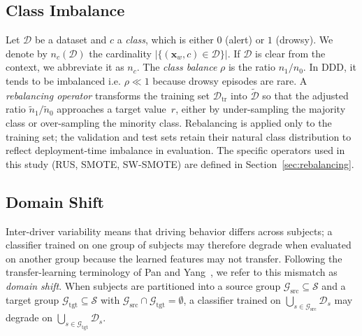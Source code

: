 \documentclass[lettersize,journal]{IEEEtran}
\begin{document}
\subsection{Class Imbalance}\label{sec:class_imbalance}
Let $\mathcal{D}$ be a dataset and $c$ a \emph{class}, which is either $0$ (alert) or $1$ (drowsy). We denote by $n_c(\mathcal{D})$ the cardinality $|\{(\mathbf{x}_w, c) \in \mathcal{D}\}|$.
If $\mathcal{D}$ is clear from the context, we abbreviate it as $n_c$.
The \emph{class balance} $\rho$ is the ratio $n_1/n_0$.
In DDD, it tends to be imbalanced i.e. $\rho \ll 1$ because drowsy episodes are rare.
A \emph{rebalancing operator} transforms the training set $\mathcal{D}_{\mathrm{tr}}$ into $\tilde{\mathcal{D}}$ so that the adjusted ratio $\tilde{n}_1 / \tilde{n}_0$ approaches a target value~$r$, either by under-sampling the majority class or over-sampling the minority class.
Rebalancing is applied only to the training set; the validation and test sets retain their natural class distribution to reflect deployment-time imbalance in evaluation.
The specific operators used in this study (RUS, SMOTE, SW-SMOTE) are defined in Section~\ref{sec:rebalancing}.

\subsection{Domain Shift}\label{sec:domain_shift}
Inter-driver variability means that driving behavior differs across subjects; a classifier trained on one group of subjects may therefore degrade when evaluated on another group because the learned features may not transfer.
Following the transfer-learning terminology of Pan and Yang~\cite{pan2010}, we refer to this mismatch as \emph{domain shift}.
When subjects are partitioned into a source group $\mathcal{G}_{\mathrm{src}} \subseteq \mathcal{S}$ and a target group $\mathcal{G}_{\mathrm{tgt}} \subseteq \mathcal{S}$ with $\mathcal{G}_{\mathrm{src}} \cap \mathcal{G}_{\mathrm{tgt}} = \emptyset$, a classifier trained on $\bigcup_{s \in \mathcal{G}_{\mathrm{src}}} \mathcal{D}_s$ may degrade on $\bigcup_{s \in \mathcal{G}_{\mathrm{tgt}}} \mathcal{D}_s$.
\end{document}
